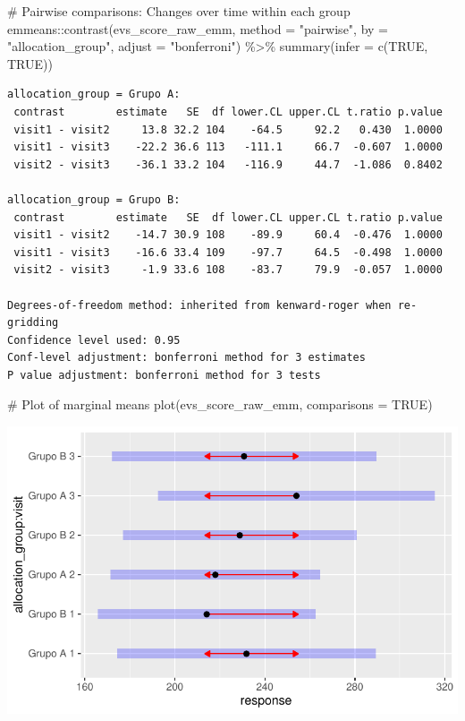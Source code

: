 \documentclass[
  12pt,
]{article}
\newenvironment{Shaded}{\begin{snugshade}}{\end{snugshade}}
\newcommand{\AttributeTok}[1]{\textcolor[rgb]{0.40,0.45,0.13}{#1}}
\newcommand{\CommentTok}[1]{\textcolor[rgb]{0.37,0.37,0.37}{#1}}
\newcommand{\ConstantTok}[1]{\textcolor[rgb]{0.56,0.35,0.01}{#1}}
\newcommand{\FunctionTok}[1]{\textcolor[rgb]{0.28,0.35,0.67}{#1}}
\newcommand{\NormalTok}[1]{\textcolor[rgb]{0.00,0.23,0.31}{#1}}
\newcommand{\SpecialCharTok}[1]{\textcolor[rgb]{0.37,0.37,0.37}{#1}}
\newcommand{\StringTok}[1]{\textcolor[rgb]{0.13,0.47,0.30}{#1}}
\begin{document}
\begin{Shaded}
\begin{Highlighting}[]
\CommentTok{\# Pairwise comparisons: Changes over time within each group}
\NormalTok{emmeans}\SpecialCharTok{::}\FunctionTok{contrast}\NormalTok{(evs\_score\_raw\_emm,}
\AttributeTok{method =} \StringTok{"pairwise"}\NormalTok{, }\AttributeTok{by =} \StringTok{"allocation\_group"}\NormalTok{,}
\AttributeTok{adjust =} \StringTok{"bonferroni"}\NormalTok{) }\SpecialCharTok{\%\textgreater{}\%} \FunctionTok{summary}\NormalTok{(}\AttributeTok{infer =} \FunctionTok{c}\NormalTok{(}\ConstantTok{TRUE}\NormalTok{, }\ConstantTok{TRUE}\NormalTok{))}
\end{Highlighting}
\end{Shaded}

\begin{verbatim}
allocation_group = Grupo A:
 contrast        estimate   SE  df lower.CL upper.CL t.ratio p.value
 visit1 - visit2     13.8 32.2 104    -64.5     92.2   0.430  1.0000
 visit1 - visit3    -22.2 36.6 113   -111.1     66.7  -0.607  1.0000
 visit2 - visit3    -36.1 33.2 104   -116.9     44.7  -1.086  0.8402

allocation_group = Grupo B:
 contrast        estimate   SE  df lower.CL upper.CL t.ratio p.value
 visit1 - visit2    -14.7 30.9 108    -89.9     60.4  -0.476  1.0000
 visit1 - visit3    -16.6 33.4 109    -97.7     64.5  -0.498  1.0000
 visit2 - visit3     -1.9 33.6 108    -83.7     79.9  -0.057  1.0000

Degrees-of-freedom method: inherited from kenward-roger when re-gridding 
Confidence level used: 0.95 
Conf-level adjustment: bonferroni method for 3 estimates 
P value adjustment: bonferroni method for 3 tests 
\end{verbatim}

\begin{Shaded}
\begin{Highlighting}[]
\CommentTok{\# Plot of marginal means}
\FunctionTok{plot}\NormalTok{(evs\_score\_raw\_emm, }\AttributeTok{comparisons =} \ConstantTok{TRUE}\NormalTok{)}
\end{Highlighting}
\end{Shaded}

\includegraphics{Outcomes_files/figure-pdf/evs_score_raw_emm-1.pdf}
\end{document}
